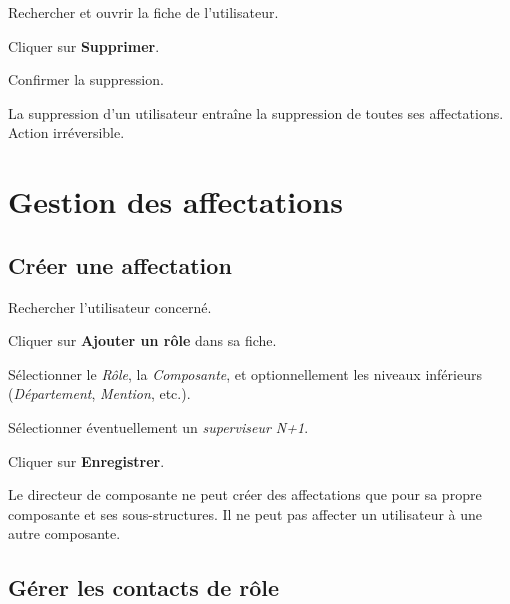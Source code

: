 \begin{steps}
  \item Rechercher et ouvrir la fiche de l'utilisateur.
  \item Cliquer sur \textbf{Supprimer}.
  \item Confirmer la suppression.
\end{steps}

\begin{warnbox}
  La suppression d'un utilisateur entra\^ine la suppression de toutes ses affectations. Action irr\'eversible.
\end{warnbox}

\section{Gestion des affectations}
\label{sec:dircomp_affectations}

\subsection{Cr\'eer une affectation}

\begin{steps}
  \item Rechercher l'utilisateur concern\'e.
  \item Cliquer sur \textbf{Ajouter un r\^ole} dans sa fiche.
  \item S\'electionner le \textit{R\^ole}, la \textit{Composante}, et optionnellement les niveaux inf\'erieurs (\textit{D\'epartement}, \textit{Mention}, etc.).
  \item S\'electionner \'eventuellement un \textit{superviseur N+1}.
  \item Cliquer sur \textbf{Enregistrer}.
\end{steps}

\begin{notebox}
  Le directeur de composante ne peut cr\'eer des affectations que pour sa propre composante et ses sous-structures. Il ne peut pas affecter un utilisateur \`a une autre composante.
\end{notebox}


\subsection{G\'erer les contacts de r\^ole}

